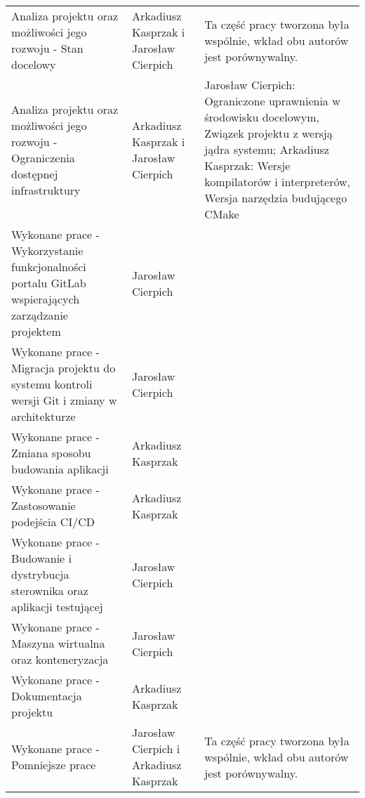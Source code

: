 \documentclass[12pt] {article}
\begin{document}
\newpage

\begin{table*}[htbp]
\centering
\begin{tabularx}{\textwidth}{@{}XXX@{}}

Analiza projektu oraz możliwości jego rozwoju - Stan docelowy & Arkadiusz Kasprzak i Jarosław Cierpich & Ta część pracy tworzona była wspólnie, wkład obu autorów jest porównywalny. \\
Analiza projektu oraz możliwości jego rozwoju - Ograniczenia dostępnej infrastruktury & Arkadiusz Kasprzak i Jarosław Cierpich & Jarosław Cierpich: Ograniczone uprawnienia w środowisku docelowym, Związek projektu z wersją jądra systemu; Arkadiusz Kasprzak: Wersje kompilatorów i interpreterów, Wersja narzędzia budującego CMake \\
Wykonane prace - Wykorzystanie funkcjonalności portalu GitLab wspierających zarządzanie projektem & Jarosław Cierpich & \\
Wykonane prace - Migracja projektu do systemu kontroli wersji Git i zmiany w architekturze & Jarosław Cierpich & \\
Wykonane prace - Zmiana sposobu budowania aplikacji & Arkadiusz Kasprzak & \\
Wykonane prace - Zastosowanie podejścia CI/CD & Arkadiusz Kasprzak & \\
Wykonane prace - Budowanie i dystrybucja sterownika oraz aplikacji testującej & Jarosław Cierpich & \\
Wykonane prace - Maszyna wirtualna oraz konteneryzacja & Jarosław Cierpich & \\
Wykonane prace - Dokumentacja projektu & Arkadiusz Kasprzak & \\
Wykonane prace - Pomniejsze prace & Jarosław Cierpich i Arkadiusz Kasprzak & Ta część pracy tworzona była wspólnie, wkład obu autorów jest porównywalny. \\

\end{tabularx}
\end{table*}

\newpage
\end{document}
